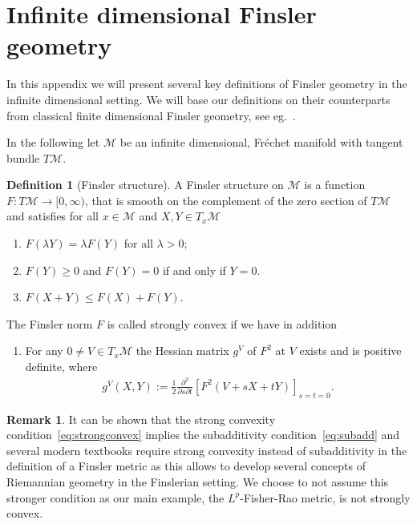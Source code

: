 \documentclass[11pt]{amsart}
\theoremstyle{definition}
\newtheorem{definition}[theorem]{Definition}
\newtheorem{remark}[theorem]{Remark}
\begin{document}
\appendix
\section{Infinite dimensional Finsler geometry}\label{sec:finsler}

In this appendix we will present several key definitions of Finsler geometry in the infinite dimensional setting. We will base our definitions on their counterparts from classical finite dimensional Finsler geometry, see eg.~\cite{bao2000introduction, chern2005riemann, rademacher2004nonreversible}. 

In the following let $\mathcal M$ be an infinite dimensional, Fr\'echet manifold with tangent bundle $T\mathcal M$.

\begin{definition}[Finsler structure]\label{def:Finsler}
A Finsler structure on $\mathcal M$ is a function $F: T\mathcal M \to [0,\infty)$, that is smooth on the complement of the zero section of $T\mathcal M$ and satisfies for all $x\in\mathcal M$ and $X,Y\in T_x\mathcal M$
\begin{enumerate}[label=(\alph*)]
\item $F(\lambda Y)=\lambda F(Y)$ for all $\lambda>0$; 
\item $F(Y)\geq 0$ and $F(Y)=0$ if and only if $Y=0$.
\item \label{eq:subadd} 
$F(X+Y)\leq F(X)+F(Y)$.
\end{enumerate}
The Finsler norm $F$ is called strongly convex if we have in addition
\begin{enumerate}[label=(\alph*),resume]
\item \label{eq:strongconvex}For any $0\neq V\in T_x\mathcal M$
the Hessian matrix $g^{V}$ of $F^2$ at $V$ exists and is positive definite, where
\begin{align*}
g^{V}(X,Y):=\frac{1}{2}\frac{\partial^2}{\partial s\partial t}\left[F^2(V+sX+tY)\right]_{s=t=0}.
\end{align*}
\end{enumerate}
\end{definition}
\begin{remark}
It can be shown that the strong convexity condition~\ref{eq:strongconvex} implies the subadditivity condition~\ref{eq:subadd} and several modern textbooks require strong convexity instead of subadditivity in the definition of a Finsler metric as this allows to develop several concepts of Riemannian geometry in the Finslerian setting. We choose to not assume this stronger condition as our main example, the $L^p$-Fisher-Rao metric, is not strongly convex.  
\end{remark}
\end{document}
